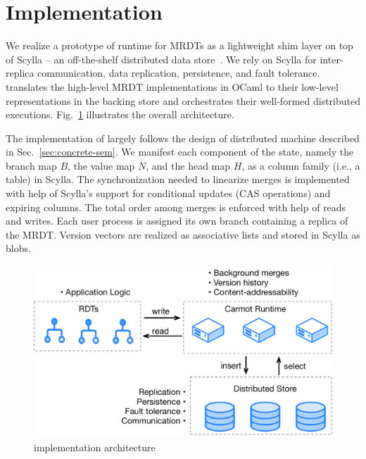 \section{Implementation}
\label{sec:implementation}

We realize a prototype of \quark runtime for MRDTs as a lightweight
shim layer on top of Scylla -- an off-the-shelf distributed data
store~\cite{scylla}. We rely on Scylla for inter-replica
communication, data replication, persistence, and fault tolerance.
\quark translates the high-level MRDT implementations in OCaml to
their low-level representations in the backing store and orchestrates
their well-formed distributed executions.
Fig.~\ref{fig:implementation} illustrates the overall architecture.

The implementation of \quark largely follows the design of \quark
distributed machine described in Sec.~\ref{sec:concrete-sem}.  We
manifest each component of the state, namely the branch map $B$, the
value map $N$, and the head map $H$, as a column family (i.e., a
table) in Scylla. The synchronization needed to linearize merges is
implemented with help of Scylla's support for conditional updates (CAS
operations) and expiring columns. The total order among merges is
enforced with help of  reads and writes. Each user process
is assigned its own branch containing a replica of the MRDT.  Version
vectors are realized as associative lists and stored in Scylla as
blobs.

\begin{figure}[ht]
  \centering
    \includegraphics[scale=0.35]{Figures/implementation2}
\caption{\quark implementation architecture}
\label{fig:implementation}
  \vspace*{-0.2in}
\end{figure}

